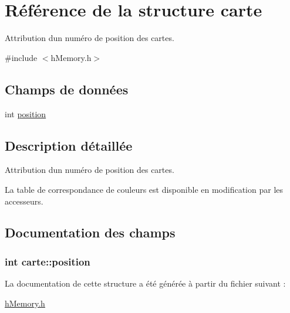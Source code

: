 \hypertarget{structcarte}{}\section{Référence de la structure carte}
\label{structcarte}


Attribution d\textquotesingle{}un numéro de position des cartes.  




{\ttfamily \#include $<$h\+Memory.\+h$>$}

\subsection*{Champs de données}
\begin{DoxyCompactItemize}
\item 
int \hyperlink{structcarte_af7699a2c1ec1516fc4f0a337e655338c}{position}
\end{DoxyCompactItemize}


\subsection{Description détaillée}
Attribution d\textquotesingle{}un numéro de position des cartes. 

La table de correspondance de couleurs est disponible en modification par les accesseurs. 

\subsection{Documentation des champs}
\subsubsection[{\texorpdfstring{position}{position}}]{\setlength{\rightskip}{0pt plus 5cm}int carte\+::position}\hypertarget{structcarte_af7699a2c1ec1516fc4f0a337e655338c}{}\label{structcarte_af7699a2c1ec1516fc4f0a337e655338c}


La documentation de cette structure a été générée à partir du fichier suivant \+:\begin{DoxyCompactItemize}
\item 
\hyperlink{h_memory_8h}{h\+Memory.\+h}\end{DoxyCompactItemize}
